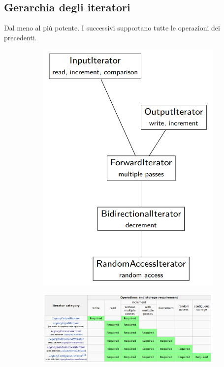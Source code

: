\documentclass[10pt, oneside]{book}
\begin{document}
\subsection{Gerarchia degli iteratori}
Dal meno al più potente. I successivi supportano tutte le operazioni dei precedenti.
\begin{figure}[h!]
\centering
\begin{subfigure}{0.25\textwidth}
\centering
\includegraphics[scale = 0.3]{iterators.png}
\end{subfigure}
\begin{subfigure}{0.7\textwidth}
\centering
\includegraphics[scale = 0.3]{iterators2.png}
\end{subfigure}
\end{figure}
\end{document}
